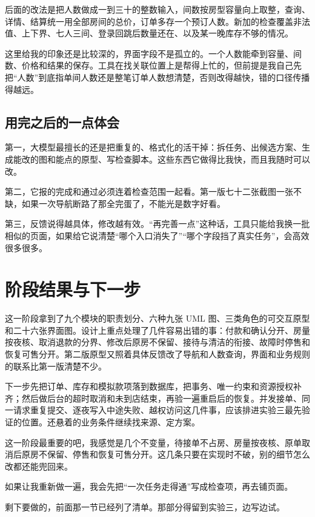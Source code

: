 \documentclass[UTF8,a4paper,zihao=-4,fontset=none]{ctexart}
\begin{document}
后面的改法是把人数做成一到三十的整数输入，间数按房型容量向上取整，查询、详情、结算统一用全部房间的总价，订单多存一个预订人数。新加的检查覆盖非法值、上下界、七人三间、登录回跳后数量还在、以及某一晚库存不够的情况。

这里给我的印象还是比较深的，界面字段不是孤立的。一个人数能牵到容量、间数、价格和结果的保存。工具在找关联位置上是帮得上忙的，但前提是我自己先把“人数”到底指单间人数还是整笔订单人数想清楚，否则改得越快，错的口径传播得越远。

\subsection{用完之后的一点体会}

第一，大模型最擅长的还是把重复的、格式化的活干掉：拆任务、出候选方案、生成能改的图和能点的原型、写检查脚本。这些东西它做得比我快，而且我随时可以改。

第二，它报的完成和通过必须连着检查范围一起看。第一版七十二张截图一张不缺，如果一次导航断路了那全完蛋了，不能光是数字好看。

第三，反馈说得越具体，修改越有效。“再完善一点”这种话，工具只能给我换一批相似的页面，如果给它说清楚“哪个入口消失了”“哪个字段挡了真实任务”，会高效很多很多。

\clearpage
\section{阶段结果与下一步}
这一阶段拿到了九个模块的职责划分、六种九张 UML 图、三类角色的可交互原型和二十六张界面图。设计上重点处理了几件容易出错的事：付款和确认分开、房量按夜核、取消退款的分界、修改后原房不保留、接待与清洁的衔接、故障时停售和恢复可售分开。第二版原型又照着具体反馈改了导航和人数查询，界面和业务规则的联系比第一版清楚不少。

下一步先把订单、库存和模拟款项落到数据库，把事务、唯一约束和资源授权补齐；然后做后台的超时取消和未到店结束，再验一遍重启后的恢复。并发接单、同一请求重复提交、逐夜写入中途失败、越权访问这几件事，应该排进实验三最先验证的位置。还悬着的业务条件继续找来源、定方案。

这一阶段最重要的吧，我感觉是几个不变量，待接单不占房、房量按夜核、原单取消后原房不保留、停售和恢复可售分开。这几条只要在实现时不破，别的细节怎么改都还能兜回来。

如果让我重新做一遍，我会先把“一次任务走得通”写成检查项，再去铺页面。

剩下要做的，前面那一节已经列了清单。那部分得留到实验三，边写边试。

\appendix
\clearpage
\end{document}
